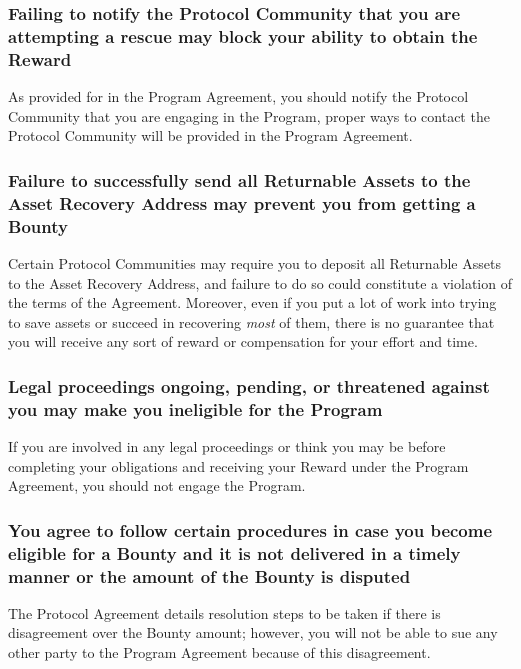 \subsubsection*{Failing to notify the Protocol Community that you are attempting a rescue may block your ability to obtain the Reward}\label{exhibit:e:notification}

As provided for in the Program Agreement, you should notify the Protocol Community that you are engaging in the Program, proper ways to contact the Protocol Community will be provided in the Program Agreement.

\subsubsection*{Failure to successfully send all Returnable Assets to the Asset Recovery Address may prevent you from getting a Bounty}\label{exhibit:e:asset_transfer}

Certain Protocol Communities may require you to deposit all Returnable Assets to the Asset Recovery Address, and failure to do so could constitute a violation of the terms of the Agreement. Moreover, even if you put a lot of work into trying to save assets or succeed in recovering \textit{most} of them, there is no guarantee that you will receive any sort of reward or compensation for your effort and time.

\subsubsection*{Legal proceedings ongoing, pending, or threatened against you may make you ineligible for the Program}\label{exhibit:e:legal_proceedings}

If you are involved in any legal proceedings or think you may be before completing your obligations and receiving your Reward under the Program Agreement, you should not engage the Program.

\subsubsection*{You agree to follow certain procedures in case you become eligible for a Bounty and it is not delivered in a timely manner or the amount of the Bounty is disputed}\label{exhibit:e:dispute_procedures}

The Protocol Agreement details resolution steps to be taken if there is disagreement over the Bounty amount; however, you will not be able to sue any other party to the Program Agreement because of this disagreement.

